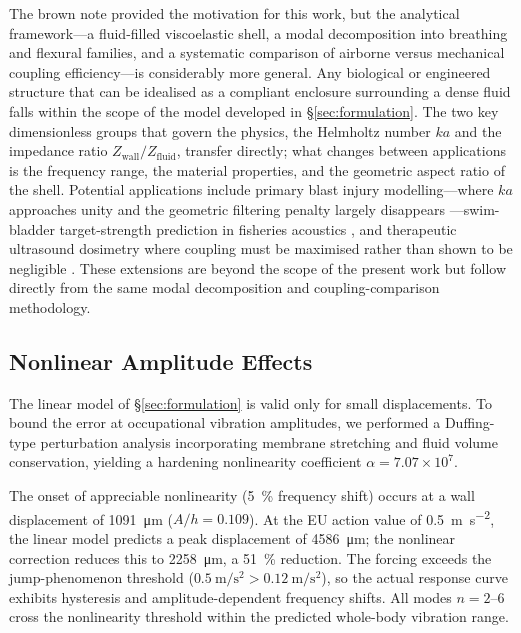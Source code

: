 The brown note provided the motivation for this work, but the analytical
framework---a fluid-filled viscoelastic shell, a modal decomposition into
breathing and flexural families, and a systematic comparison of airborne
versus mechanical coupling efficiency---is considerably more general.  Any
biological or engineered structure that can be idealised as a compliant
enclosure surrounding a dense fluid falls within the scope of the model
developed in \S\ref{sec:formulation}.  The two key dimensionless groups that
govern the physics, the Helmholtz number $ka$ and the impedance ratio
$Z_{\mathrm{wall}}/Z_{\mathrm{fluid}}$, transfer directly; what changes
between applications is the frequency range, the material properties, and
the geometric aspect ratio of the shell.  Potential applications include
primary blast injury modelling---where $ka$ approaches unity and the
geometric filtering penalty largely disappears
\cite{Stuhmiller2008,Owers2011}---swim-bladder target-strength prediction
in fisheries acoustics \cite{Feuillade1996,Love1978}, and therapeutic
ultrasound dosimetry where coupling must be maximised rather than shown to be
negligible \cite{terHaar2007}.  These extensions are beyond the scope of the
present work but follow directly from the same modal decomposition and
coupling-comparison methodology.

\subsection{Nonlinear Amplitude Effects}
\label{sec:disc:nonlinear}

The linear model of \S\ref{sec:formulation} is valid only for small
displacements.  To bound the error at occupational vibration amplitudes, we
performed a Duffing-type perturbation analysis incorporating membrane
stretching and fluid volume conservation, yielding a hardening nonlinearity
coefficient $\alpha = 7.07 \times 10^7$.

The onset of appreciable nonlinearity (\SI{5}{\percent} frequency shift) occurs
at a wall displacement of \SI{1091}{\micro\metre} ($A/h = 0.109$).  At the EU
action value of \SI{0.5}{\metre\per\second\squared}, the linear model predicts
a peak displacement of \SI{4586}{\micro\metre}; the nonlinear correction
reduces this to \SI{2258}{\micro\metre}, a \SI{51}{\percent} reduction.  The
forcing exceeds the jump-phenomenon threshold ($\SI{0.5}{\metre\per\second
\squared} > \SI{0.12}{\metre\per\second\squared}$), so the actual response
curve exhibits hysteresis and amplitude-dependent frequency shifts.  All modes
$n = 2$--$6$ cross the nonlinearity threshold within the predicted whole-body
vibration range.

